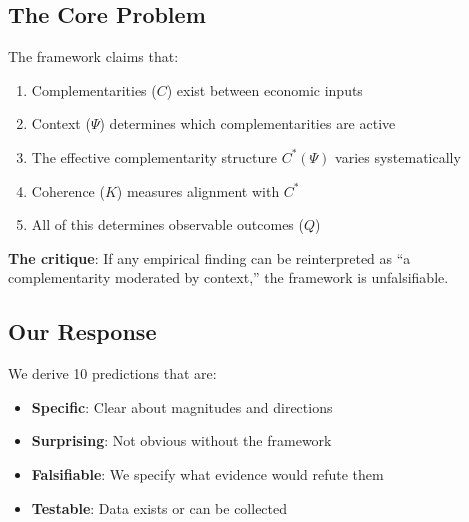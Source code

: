 \subsection{The Core Problem}

The framework claims that:
\begin{enumerate}
    \item Complementarities ($C$) exist between economic inputs
    \item Context ($\Psi$) determines which complementarities are active
    \item The effective complementarity structure $C^*(\Psi)$ varies systematically
    \item Coherence ($K$) measures alignment with $C^*$
    \item All of this determines observable outcomes ($Q$)
\end{enumerate}

\begin{tcolorbox}[colback=red!5!white, colframe=red!75!black,
    title=The Fundamental Question]
\textbf{The critique}: If any empirical finding can be reinterpreted as ``a complementarity moderated by context,'' the framework is unfalsifiable.
\end{tcolorbox}

\subsection{Our Response}

We derive 10 predictions that are:
\begin{itemize}
    \item \textbf{Specific}: Clear about magnitudes and directions
    \item \textbf{Surprising}: Not obvious without the framework
    \item \textbf{Falsifiable}: We specify what evidence would refute them
    \item \textbf{Testable}: Data exists or can be collected
\end{itemize}

